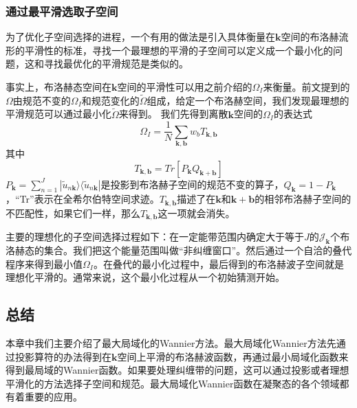 \subsubsection{通过最平滑选取子空间}
为了优化子空间选择的进程，一个有用的做法是引入具体衡量在$\bm{k}$空间的布洛赫流形的平滑性的标准，寻找一个最理想的平滑的子空间可以定义成一个最小化的问题，这和寻找最优化的平滑规范是类似的。

事实上，布洛赫态空间在$\bm{k}$空间的平滑性可以用之前介绍的$\Omega_I$来衡量。前文提到的$\Omega$由规范不变的$\Omega_I$和规范变化的$\widetilde \Omega$组成，给定一个布洛赫空间，我们发现最理想的平滑规范可以通过最小化$\widetilde \Omega$来得到。
我们先得到离散$\bm{k}$空间的$\Omega_I$的表达式
\begin{equation}
\Omega_I=\frac{1}{N}\sum_{\bm{k},\bm{b}}w_bT_{\bm{k},\bm{b}}
\end{equation}
其中
\begin{equation}
T_{\bm{k},\bm{b}}=Tr[P_{\bm{k}}Q_{\bm{k+b}}]
\end{equation}
$P_{\bm{k}}=\sum_{n=1}^{J}|\widetilde u_{n \bm{k}}\rangle \langle\widetilde u_{n \bm{k}}|$是投影到布洛赫子空间的规范不变的算子，$Q_{\bm{k}}=1-P_{\bm{k}}$，“Tr”表示在全希尔伯特空间求迹。$T_{\bm{k},\bm{b}}$描述了在$\bm{k}$和$\bm{k+b}$的相邻布洛赫子空间的不匹配性，如果它们一样，那么$T_{\bm{k},\bm{b}}$这一项就会消失。

主要的理想化的子空间选择过程如下：在一定能带范围内确定大于等于$J$的$\mathcal{J}_{\bm{k}}$个布洛赫态的集合。我们把这个能量范围叫做“非纠缠窗口”。然后通过一个自洽的叠代程序来得到最小值$\Omega_I$。在叠代的最小化过程中，最后得到的布洛赫波子空间就是理想化平滑的。通常来说，这个最小化过程从一个初始猜测开始。

\subsection{总结}
本章中我们主要介绍了最大局域化的Wannier方法。最大局域化Wannier方法先通过投影算符的办法得到在$\bm{k}$空间上平滑的布洛赫波函数，再通过最小局域化函数来得到最局域的Wannier函数。如果要处理纠缠带的问题，这可以通过投影或者理想平滑化的方法选择子空间和规范。最大局域化Wannier函数在凝聚态的各个领域都有着重要的应用。